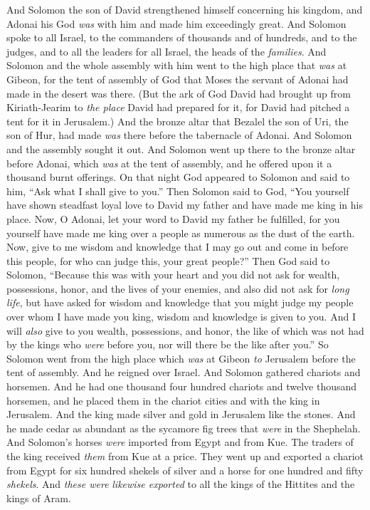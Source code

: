 
\begin{biblechapter} %
 And Solomon the son of David strengthened himself concerning his kingdom, and Adonai his God \textit{was} with him and made him exceedingly great.
\verse And Solomon spoke to all Israel, to the commanders of thousands and of hundreds, and to the judges, and to all the leaders for all Israel, the heads of the \textit{families}.
\verse And Solomon and the whole assembly with him went to the high place that \textit{was} at Gibeon, for the tent of assembly of God that Moses the servant of Adonai had made in the desert was there.
\verse (But the ark of God David had brought up from Kiriath-Jearim to \textit{the place} David had prepared for it, for David had pitched a tent for it in Jerusalem.)
\verse And the bronze altar that Bezalel the son of Uri, the son of Hur, had made \textit{was} there before the tabernacle of Adonai. And Solomon and the assembly sought it out.
\verse And Solomon went up there to the bronze altar before Adonai, which \textit{was} at the tent of assembly, and he offered upon it a thousand burnt offerings.
 On that night God appeared to Solomon and said to him, “Ask what I shall give to you.”
\verse Then Solomon said to God, “You yourself have shown steadfast loyal love to David my father and have made me king in his place.
\verse Now, O Adonai, let your word to David my father be fulfilled, for you yourself have made me king over a people as numerous as the dust of the earth.
\verse Now, give to me wisdom and knowledge that I may go out and come in before this people, for who can judge this, your great people?”
\verse Then God said to Solomon, “Because this was with your heart and you did not ask for wealth, possessions, honor, and the lives of your enemies, and also did not ask for \textit{long life}, but have asked for wisdom and knowledge that you might judge my people over whom I have made you king,
\verse wisdom and knowledge is given to you. And I will \textit{also} give to you wealth, possessions, and honor, the like of which was not had by the kings who \textit{were} before you, nor will there be the like after you.”
\verse So Solomon went from the high place which \textit{was} at Gibeon \textit{to} Jerusalem before the tent of assembly. And he reigned over Israel.
 And Solomon gathered chariots and horsemen. And he had one thousand four hundred chariots and twelve thousand horsemen, and he placed them in the chariot cities and with the king in Jerusalem.
\verse And the king made silver and gold in Jerusalem like the stones. And he made cedar as abundant as the sycamore fig trees that \textit{were} in the Shephelah.
\verse And Solomon’s horses \textit{were} imported from Egypt and from Kue. The traders of the king received \textit{them} from Kue at a price.
\verse They went up and exported a chariot from Egypt for six hundred shekels of silver and a horse for one hundred and fifty \textit{shekels}. And \textit{these were} \textit{likewise exported} to all the kings of the Hittites and the kings of Aram.
\end{biblechapter}

